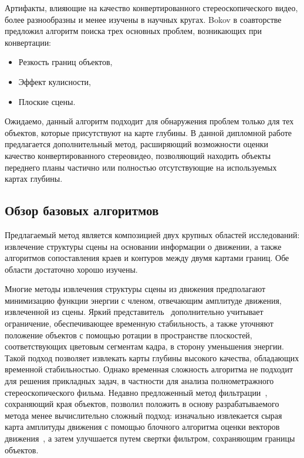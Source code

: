 \documentclass[14pt, a4paper]{extarticle}
\begin{document}
Артифакты, влияющие на качество конвертированного стереоскопического видео, более 
разнообразны и менее изучены в научных кругах. Bokov в соавторстве~\cite{bokov2014automatic} 
предложил алгоритм поиска трех основных проблем, возникающих при конвертации:
\begin{itemize}
	\item Резкость границ объектов,
	\item Эффект кулисности,
	\item Плоские сцены.
\end{itemize}
Ожидаемо, данный алгоритм подходит для обнаружения проблем только для тех объектов, 
которые присутствуют на карте глубины. В данной дипломной работе предлагается 
дополнительный метод, расширяющий возможности оценки качество конвертированного стереовидео,
позволяющий находить объекты переднего планы частично или полностью отсутствующие
на используемых картах глубины.

\subsection{Обзор базовых алгоритмов}

Предлагаемый метод является композицией двух крупных областей исследований: извлечение структуры 
сцены на основании информации о движении, а также алгоритмов сопоставления краев и контуров 
между двумя картами границ. Обе области достаточно хорошо изучены.

Многие методы извлечения структуры сцены из движения предполагают минимизацию функции энергии
с членом, отвечающим амплитуде движения, извлеченной из сцены. Яркий 
представитель~\cite{zhang2009consistent} дополнительно учитывает ограничение, 
обеспечивающее временную стабильность, а также уточняют положение объектов с помощью ротации 
в пространстве плоскостей, соответствующих цветовым сегментам кадра, в сторону уменьшения энергии.
Такой подход позволяет извлекать карты глубины высокого качества, обладающих временной стабильностью.
Однако временная сложность алгоритма не подходит для решения прикладных задач, в частности 
для анализа полнометражного стереоскопического фильма. Недавно предложенный метод
фильтрации~\cite{he2013guided}, сохраняющий края объектов, позволил положить в основу разрабатываемого
метода менее вычислительно сложный подход: изначально извлекается сырая карта амплитуды движения 
с помощью блочного алгоритма оценки векторов движения~\cite{simonyan2008fast}, а затем улучшается
путем свертки фильтром, сохраняющим границы объектов.
\end{document}
